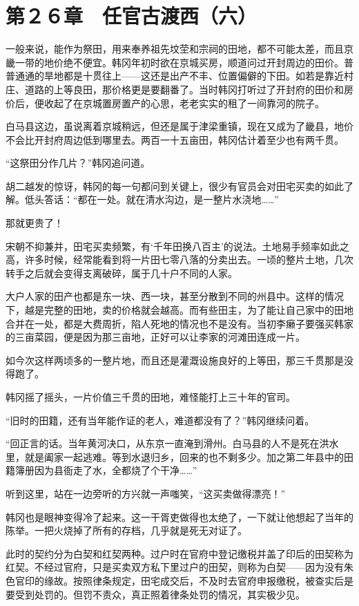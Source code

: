 \section{第２６章　任官古渡西（六）}

一般来说，能作为祭田，用来奉养祖先坟茔和宗祠的田地，都不可能太差，而且京畿一带的地价绝不便宜。韩冈年初时欲在京城买房，顺道问过开封周边的田价。普普通通的旱地都是十贯往上——这还是出产不丰、位置偏僻的下田。如若是靠近村庄、道路的上等良田，那价格更是要翻番了。当时韩冈打听过了开封府的田价和房价后，便收起了在京城置房置产的心思，老老实实的租了一间靠河的院子。

白马县这边，虽说离着京城稍远，但还是属于津梁重镇，现在又成为了畿县，地价不会比开封府周边低到哪里去。两百一十五亩田，韩冈估计着至少也有两千贯。

“这祭田分作几片？”韩冈追问道。

胡二越发的惊讶，韩冈的每一句都问到关键上，很少有官员会对田宅买卖的如此了解。低头答话：“都在一处。就在清水沟边，是一整片水浇地……”

那就更贵了！

宋朝不抑兼并，田宅买卖频繁，有‘千年田换八百主’的说法。土地易手频率如此之高，许多时候，经常能看到将一片田七零八落的分卖出去。一顷的整片土地，几次转手之后就会变得支离破碎，属于几十户不同的人家。

大户人家的田产也都是东一块、西一块，甚至分散到不同的州县中。这样的情况下，越是完整的田地，卖的价格就会越高。而有些田主，为了能让自己家中的田地合并在一处，都是大费周折，陷人死地的情况也不是没有。当初李癞子要强买韩家的三亩菜园，便是因为那三亩地，正好可以让李家的河滩田连成一片。

如今次这样两顷多的一整片地，而且还是灌溉设施良好的上等田，那三千贯那是没得跑了。

韩冈摇了摇头，一片价值三千贯的田地，难怪能打上三十年的官司。

“旧时的田籍，还有当年能作证的老人，难道都没有了？”韩冈继续问着。

“回正言的话。当年黄河决口，从东京一直淹到滑州。白马县的人不是死在洪水里，就是阖家一起逃难。等到水退归乡，回来的也不剩多少。加之第二年县中的田籍簿册因为县衙走了水，全都烧了个干净……”

听到这里，站在一边旁听的方兴就一声嗤笑，“这买卖做得漂亮！”

韩冈也是眼神变得冷了起来。这一干胥吏做得也太绝了，一下就让他想起了当年的陈举。一把火烧掉了所有的存档，几乎就是死无对证了。

此时的契约分为白契和红契两种。过户时在官府中登记缴税并盖了印后的田契称为红契。不经过官府，只是买卖双方私下里过户的田契，则称为白契——因为没有朱色官印的缘故。按照律条规定，田宅成交后，不及时去官府申报缴税，被查实后是要受到处罚的。但罚不责众，真正照着律条处罚的情况，其实极少见。

